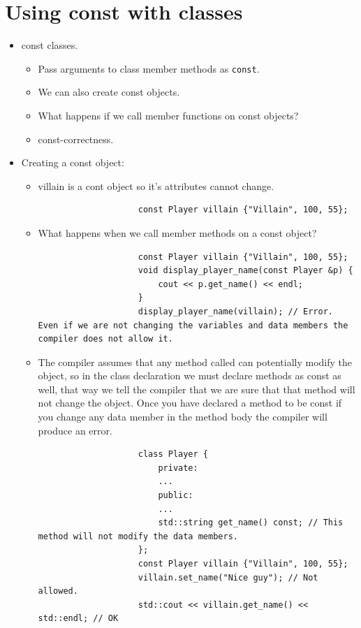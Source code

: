 \section{Using const with classes}
\begin{itemize}
    \item const classes.
        \begin{itemize}
            \item Pass arguments to class member methods as \texttt{const}.
            \item We can also create const objects.
            \item What happens if we call member functions on const objects?
            \item const-correctness. 
        \end{itemize}
    
    \item Creating a const object:
        \begin{itemize}
            \item villain is a cont object so it's attributes cannot change.
                \begin{verbatim}
                    const Player villain {"Villain", 100, 55};
                \end{verbatim}
            
            \item What happens when we call member methods on a const object?
                \begin{verbatim}
                    const Player villain {"Villain", 100, 55};
                    void display_player_name(const Player &p) {
                        cout << p.get_name() << endl;
                    }
                    display_player_name(villain); // Error. Even if we are not changing the variables and data members the compiler does not allow it.
                \end{verbatim}
            
            \item The compiler assumes that any method called can potentially modify the object, so in the class declaration we must declare methods as const as well, that way we tell the compiler that we are sure that that method will not change the object. Once you have declared a method to be const if you change any data member in the method body the compiler will produce an error.
                \begin{verbatim}
                    class Player {
                        private:
                        ...
                        public: 
                        ...
                        std::string get_name() const; // This method will not modify the data members.
                    };
                    const Player villain {"Villain", 100, 55}; 
                    villain.set_name("Nice guy"); // Not allowed.
                    std::cout << villain.get_name() << std::endl; // OK
                \end{verbatim}
        \end{itemize}
\end{itemize}
